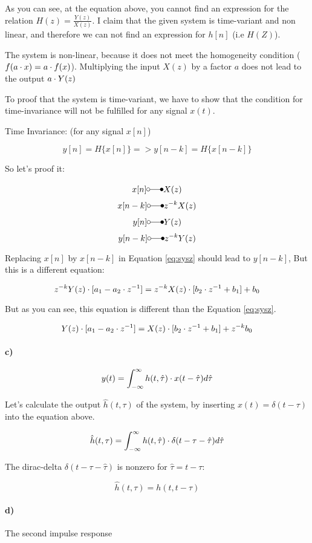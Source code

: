 As you can see, at the equation above, you cannot find an expression for the relation
$H(z) = \frac{Y(z)}{X(z)}$. I claim that the given system is time-variant and non linear, and therefore we can not
find an expression for $h[n]$ (i.e $H(Z)$).

The system is non-linear, because it does not meet the homogeneity condition ($f(a \cdot x) = a \cdot f(x)$).
Multiplying the input $X(z)$ by a factor $a$ does not lead to the output $a \cdot Y(z)$

To proof that the system is time-variant, we have to show that the condition
for time-invariance will not be fulfilled for any signal $x(t)$.

Time Invariance: (for any signal $x[n]$)

\begin{equation}
 y[n] = H\{x[n]\} => y[n-k] = H\{x[n-k]\}
\end{equation}

So let's proof it:

$$x[n] \laplace X(z)$$
$$x[n-k] \laplace z^{-k} X(z)$$
$$y[n] \laplace Y(z)$$
$$y[n-k] \laplace z^{-k} Y(z)$$

Replacing $x[n]$ by $x[n-k]$ in Equation \ref{eq:sysz} should lead to $y[n-k]$,
But this is a different equation:

\begin{equation}
z^{-k}Y(z) \cdot [a_1 - a_2 \cdot z^{-1}]= z^{-k}X(z) \cdot [b_2 \cdot z^{-1} + b_1] + b_0
\end{equation}

But as you can see, this equation is different than the Equation \ref{eq:sysz}.

\begin{equation}
Y(z) \cdot [a_1 - a_2 \cdot z^{-1}]= X(z) \cdot [b_2 \cdot z^{-1} + b_1] + z^{-k}b_0
\end{equation}

\paragraph{c)}

\begin{equation}
 y(t) = \int_{-\infty}^{\infty} h(t,\hat{\tau}) \cdot x(t-\hat{\tau}) d\hat{\tau}
\end{equation}

Let's calculate the output $\hat{h}(t,\tau)$ of the system, by inserting $x(t) = \delta(t-\tau)$
into the equation above.

\begin{equation}
 \hat{h}(t,\tau) = \int_{-\infty}^{\infty} h(t,\hat{\tau}) \cdot \delta(t-\tau - \hat{\tau}) d\hat{\tau}
\end{equation}

The dirac-delta $\delta(t-\tau - \hat{\tau})$ is nonzero for $\hat{\tau} = t-\tau$:

\begin{equation}
 \hat{h}(t,\tau) = h(t,t-\tau)
\end{equation}


\paragraph{d)}


The second impulse response


